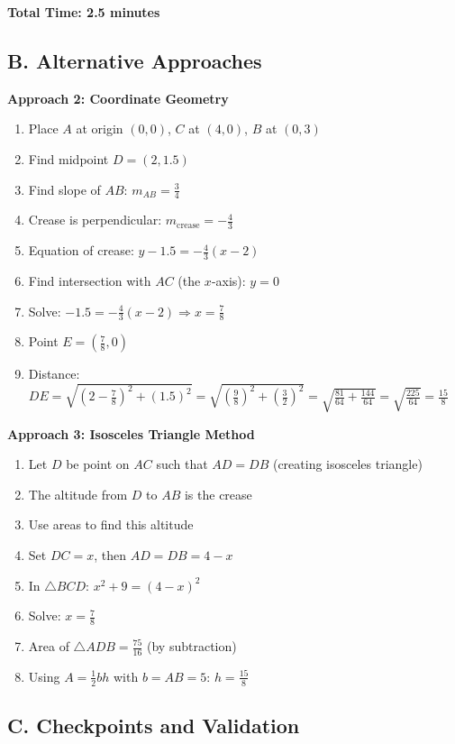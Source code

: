 \documentclass[12pt]{article}
\begin{document}
\begin{roadmapbox}
\textbf{Total Time: 2.5 minutes}

\subsection*{B. Alternative Approaches}

\textbf{Approach 2: Coordinate Geometry}
\begin{enumerate}
    \item Place $A$ at origin $(0,0)$, $C$ at $(4,0)$, $B$ at $(0,3)$
    \item Find midpoint $D = (2, 1.5)$
    \item Find slope of $AB$: $m_{AB} = \frac{3}{4}$
    \item Crease is perpendicular: $m_{\text{crease}} = -\frac{4}{3}$
    \item Equation of crease: $y - 1.5 = -\frac{4}{3}(x - 2)$
    \item Find intersection with $AC$ (the $x$-axis): $y = 0$
    \item Solve: $-1.5 = -\frac{4}{3}(x-2) \Rightarrow x = \frac{7}{8}$
    \item Point $E = (\frac{7}{8}, 0)$
    \item Distance: $DE = \sqrt{(2-\frac{7}{8})^2 + (1.5)^2} = \sqrt{(\frac{9}{8})^2 + (\frac{3}{2})^2} = \sqrt{\frac{81}{64} + \frac{144}{64}} = \sqrt{\frac{225}{64}} = \frac{15}{8}$
\end{enumerate}

\textbf{Approach 3: Isosceles Triangle Method}
\begin{enumerate}
    \item Let $D$ be point on $AC$ such that $AD = DB$ (creating isosceles triangle)
    \item The altitude from $D$ to $AB$ is the crease
    \item Use areas to find this altitude
    \item Set $DC = x$, then $AD = DB = 4 - x$
    \item In $\triangle BCD$: $x^2 + 9 = (4-x)^2$
    \item Solve: $x = \frac{7}{8}$
    \item Area of $\triangle ADB = \frac{75}{16}$ (by subtraction)
    \item Using $A = \frac{1}{2}bh$ with $b = AB = 5$: $h = \frac{15}{8}$
\end{enumerate}

\subsection*{C. Checkpoints and Validation}


\end{roadmapbox}
\end{document}
